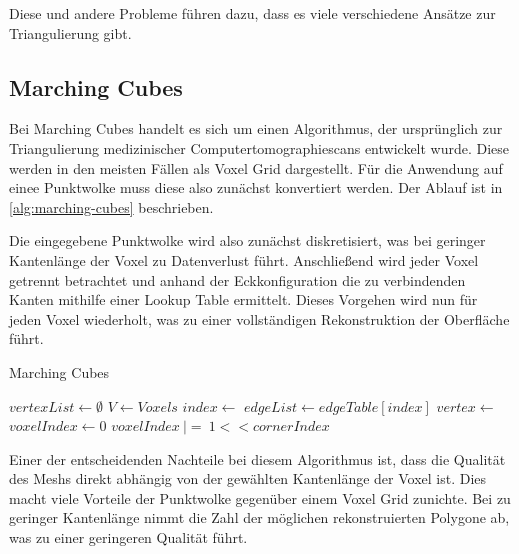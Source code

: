 Diese und andere Probleme führen dazu, dass es viele verschiedene Ansätze zur Triangulierung gibt.


\subsection{Marching Cubes}
\label{subsec:marching-cubes}

Bei Marching Cubes \cite{lorensen1987marching} handelt es sich um einen Algorithmus, der ursprünglich zur Triangulierung medizinischer Computertomographiescans entwickelt wurde.
Diese werden in den meisten Fällen als Voxel Grid dargestellt.
Für die Anwendung auf einee Punktwolke muss diese also zunächst konvertiert werden.
Der Ablauf ist in \autoref{alg:marching-cubes} beschrieben.

Die eingegebene Punktwolke wird also zunächst diskretisiert, was bei geringer Kantenlänge der Voxel zu Datenverlust führt.
Anschließend wird jeder Voxel getrennt betrachtet und anhand der Eckkonfiguration die zu verbindenden Kanten mithilfe einer Lookup Table ermittelt.
Dieses Vorgehen wird nun für jeden Voxel wiederholt, was zu einer vollständigen Rekonstruktion der Oberfläche führt.

\begin{algorithm}[ht]
\caption[Marching Cubes]{Marching Cubes \cite[Abs. 4]{lorensen1987marching}}
\label{alg:marching-cubes}
\begin{algorithmic}
	\State $vertexList \gets \emptyset$
	\State $V \gets Voxels$
		\State $index \gets$ 
		\State $edgeList \gets edgeTable[index]$
			\State $vertex \gets$ 
			\State {}
		\EndFor
	\EndFor
\EndFunction
{}
	\State $voxelIndex \gets 0$
			\State $voxelIndex\ |=\ 1 << cornerIndex$
		\EndIf
	\EndFor
	\State {}
\EndFunction
\end{algorithmic}
\end{algorithm}

Einer der entscheidenden Nachteile bei diesem Algorithmus ist, dass die Qualität des Meshs direkt abhängig von der gewählten Kantenlänge der Voxel ist.
Dies macht viele Vorteile der Punktwolke gegenüber einem Voxel Grid zunichte.
Bei zu geringer Kantenlänge nimmt die Zahl der möglichen rekonstruierten Polygone ab, was zu einer geringeren Qualität führt.


